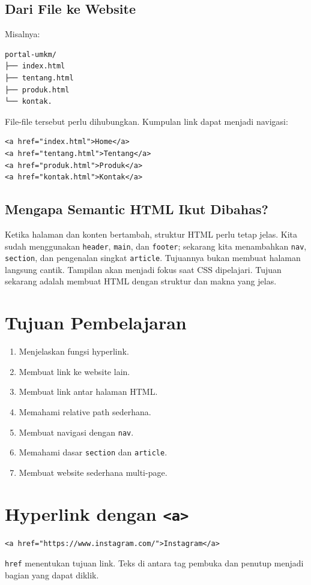 \documentclass[11pt,a4paper]{article}
\begin{document}
\subsection{Dari File ke Website}
Misalnya:
\begin{lstlisting}[style=htmlstyle]
portal-umkm/
├── index.html
├── tentang.html
├── produk.html
└── kontak.
\end{lstlisting}
File-file tersebut perlu dihubungkan. Kumpulan link dapat menjadi navigasi:
\begin{lstlisting}[style=htmlstyle]
<a href="index.html">Home</a>
<a href="tentang.html">Tentang</a>
<a href="produk.html">Produk</a>
<a href="kontak.html">Kontak</a>
\end{lstlisting}
\subsection{Mengapa Semantic HTML Ikut Dibahas?}
Ketika halaman dan konten bertambah, struktur HTML perlu tetap jelas. Kita sudah menggunakan \texttt{header}, \texttt{main}, dan \texttt{footer}; sekarang kita menambahkan \texttt{nav}, \texttt{section}, dan pengenalan singkat \texttt{article}.
Tujuannya bukan membuat halaman langsung cantik. Tampilan akan menjadi fokus saat CSS dipelajari. Tujuan sekarang adalah membuat HTML dengan struktur dan makna yang jelas.

\section{Tujuan Pembelajaran}
\begin{enumerate}[label=\arabic*.]
\item Menjelaskan fungsi hyperlink.
\item Membuat link ke website lain.
\item Membuat link antar halaman HTML.
\item Memahami relative path sederhana.
\item Membuat navigasi dengan \texttt{nav}.
\item Memahami dasar \texttt{section} dan \texttt{article}.
\item Membuat website sederhana multi-page.
\end{enumerate}

\section{Hyperlink dengan \texttt{<a>}}
\begin{lstlisting}[style=htmlstyle]
<a href="https://www.instagram.com/">Instagram</a>
\end{lstlisting}
\texttt{href} menentukan tujuan link. Teks di antara tag pembuka dan penutup menjadi bagian yang dapat diklik.
\end{document}
